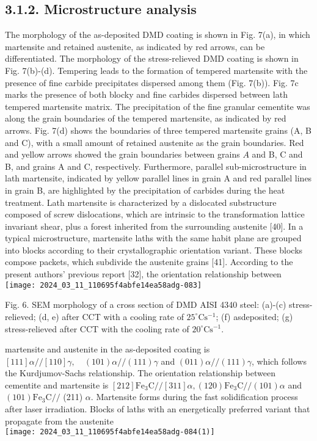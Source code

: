 \documentclass[10pt]{article}
\begin{document}
\subsection*{3.1.2. Microstructure analysis}
The morphology of the as-deposited DMD coating is shown in Fig. 7(a), in which martensite and retained austenite, as indicated by red arrows, can be differentiated. The morphology of the stress-relieved DMD coating is shown in Fig. 7(b)-(d). Tempering leads to the formation of tempered martensite with the presence of fine carbide precipitates dispersed among them (Fig. 7(b)). Fig. 7c marks the presence of both blocky and fine carbides dispersed between lath tempered martensite matrix. The precipitation of the fine granular cementite was along the grain boundaries of the tempered martensite, as indicated by red arrows. Fig. 7(d) shows the boundaries of three tempered martensite grains (A, B and C), with a small amount of retained austenite as the grain boundaries. Red and yellow arrows showed the grain boundaries between grains $A$ and B, C and B, and grains A and C, respectively. Furthermore, parallel sub-microstructure in lath martensite, indicated by yellow parallel lines in grain A and red parallel lines in grain B, are highlighted by the precipitation of carbides during the heat treatment. Lath martensite is characterized by a dislocated substructure composed of screw dislocations, which are intrinsic to the transformation lattice invariant shear, plus a forest inherited from the surrounding austenite [40]. In a typical microstructure, martensite laths with the same habit plane are grouped into blocks according to their crystallographic orientation variant. These blocks compose packets, which subdivide the austenite grains [41]. According to the present authors' previous report [32], the orientation relationship between\\
\texttt{[image: 2024\_03\_11\_110695f4abfe14ea58adg-083]}

Fig. 6. SEM morphology of a cross section of DMD AISI 4340 steel: (a)-(c) stress-relieved; (d, e) after CCT with a cooling rate of $25^{\circ} \mathrm{C} \mathrm{s}^{-1}$; (f) asdeposited; (g) stress-relieved after CCT with the cooling rate of $20^{\circ} \mathrm{C} \mathrm{s}^{-1}$.

martensite and austenite in the as-deposited coating is $[111] \alpha / /[110] \gamma, \quad(101) \alpha / /(111) \gamma$ and $(011) \alpha / /(111) \gamma$, which follows the Kurdjumov-Sachs relationship. The orientation relationship between cementite and martensite is $[212] \mathrm{Fe}_{3} \mathrm{C} / /[311] \alpha,(120) \mathrm{Fe}_{3} \mathrm{C} / /(101) \alpha$ and $(101) \mathrm{Fe}_{3} \mathrm{C} / /$ (211) $\alpha$. Martensite forms during the fast solidification process after laser irradiation. Blocks of laths with an energetically preferred variant that propagate from the austenite\\
\texttt{[image: 2024\_03\_11\_110695f4abfe14ea58adg-084(1)]}
\end{document}
